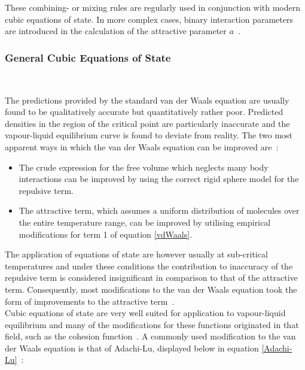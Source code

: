 These combining- or mixing rules are regularly used in conjunction with modern cubic equations of state. In more complex cases, binary interaction parameters are introduced in the calculation of the attractive parameter $a$~\cite{ThermophysicalProperties}.\

\subsubsection{General Cubic Equations of State}\

The predictions provided by the standard van der Waals equation are usually found to be qualitatively accurate but quantitatively rather poor. Predicted densities in the region of the critical point are particularly inaccurate and the vapour-liquid equilibrium curve is found to deviate from reality. The two most apparent ways in which the van der Waals equation can be improved are~\cite{ThermophysicalProperties, ThermodynamicModels}:\
\begin{itemize}
\item The crude expression for the free volume which neglects many body interactions can be improved by using the correct rigid sphere model for the repulsive term.\
\item The attractive term, which assumes a uniform distribution of molecules over the entire temperature range, can be improved by utilising empirical modifications for term 1 of equation \ref{vdWaals}.\
\end{itemize}

The application of equations of state are however usually at sub-critical temperatures and under these conditions the contribution to inaccuracy of the repulsive term is considered insignificant in comparison to that of the attractive term. Consequently, most modifications to the van der Waals equation took the form of improvements to the attractive term~\cite{ThermophysicalProperties, EOSModification}.\\

Cubic equations of state are very well suited for application to vapour-liquid equilibrium and many of the modifications for these functions originated in that field, such as the cohesion function~\cite{Parsafar}. A commonly used modification to the van der Waals equation is that of Adachi-Lu, displayed below in equation \ref{Adachi-Lu}~\cite{Adachi-Lu}:\

